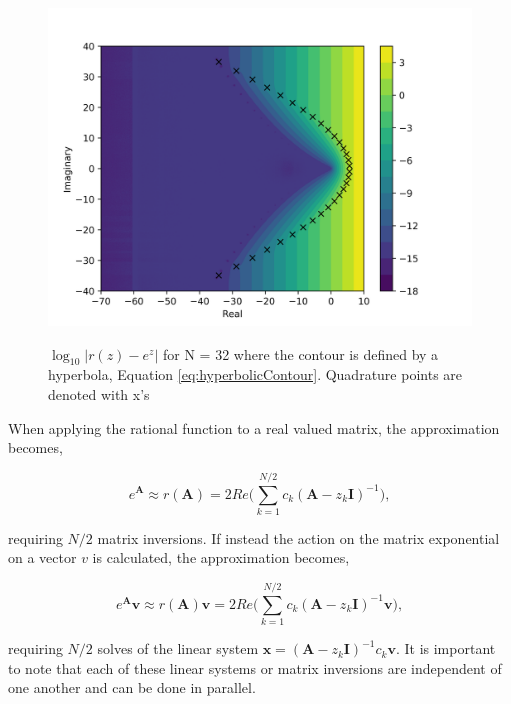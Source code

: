 \begin{figure}[h]
  \centering
  \includegraphics[width=5in]{images/RationApproxHyperbolicError32.png}\\
  \caption{$\log_{10}|r(z)-e^{z}|$ for N = 32 where the contour is defined by a hyperbola, Equation \ref{eq:hyperbolicContour}. Quadrature points are denoted with x's}
  \label{fig:complexRationalApproxHyperbola}
\end{figure} 





\noindent When applying the rational function to a real valued matrix, the approximation becomes,

\begin{equation}
    e^{\boldsymbol{A}} \approx r(\boldsymbol{A}) = 2Re\bigg(\sum_{k=1}^{N/2}c_{k}(\boldsymbol{A} - z_{k}\boldsymbol{I})^{-1}\bigg),
\end{equation}

\noindent requiring $N/2$ matrix inversions. If instead the action on the matrix exponential on a vector $v$ is calculated, the approximation becomes,

\begin{equation}
    e^{\boldsymbol{A}}\boldsymbol{v} \approx r(\boldsymbol{A})\boldsymbol{v} = 2Re\bigg(\sum_{k=1}^{N/2}c_{k}(\boldsymbol{A} - z_{k}\boldsymbol{I})^{-1}\boldsymbol{v}\bigg),
\end{equation}

\noindent requiring $N/2$ solves of the linear system $\boldsymbol{x} = (\boldsymbol{A} - z_{k}\boldsymbol{I})^{-1}c_{k}\boldsymbol{v}$. It is important to note that each of these linear systems or matrix inversions are independent of one another and can be done in parallel. 

